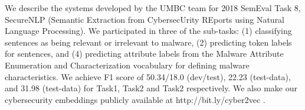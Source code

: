 We describe the systems developed by the UMBC team for 2018 SemEval Task 8, SecureNLP (Semantic Extraction from CybersecUrity REports using Natural Language Processing). We participated in three of the sub-tasks: (1) classifying sentences as being relevant or irrelevant to malware, (2) predicting token labels for sentences, and (4) predicting attribute labels from the Malware Attribute Enumeration and Characterization vocabulary for defining malware characteristics. We achieve F1 score of 50.34/18.0 (dev/test), 22.23 (test-data), and 31.98 (test-data) for Task1, Task2 and Task2 respectively. We also make our cybersecurity embeddings publicly available at http://bit.ly/cyber2vec .
